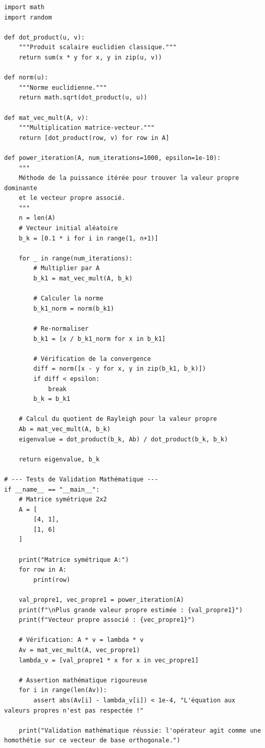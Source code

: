 \documentclass[11pt,a4paper]{article}
\begin{document}
\begin{lstlisting}
import math
import random

def dot_product(u, v):
    """Produit scalaire euclidien classique."""
    return sum(x * y for x, y in zip(u, v))

def norm(u):
    """Norme euclidienne."""
    return math.sqrt(dot_product(u, u))

def mat_vec_mult(A, v):
    """Multiplication matrice-vecteur."""
    return [dot_product(row, v) for row in A]

def power_iteration(A, num_iterations=1000, epsilon=1e-10):
    """
    Méthode de la puissance itérée pour trouver la valeur propre dominante
    et le vecteur propre associé.
    """
    n = len(A)
    # Vecteur initial aléatoire
    b_k = [0.1 * i for i in range(1, n+1)]

    for _ in range(num_iterations):
        # Multiplier par A
        b_k1 = mat_vec_mult(A, b_k)

        # Calculer la norme
        b_k1_norm = norm(b_k1)

        # Re-normaliser
        b_k1 = [x / b_k1_norm for x in b_k1]

        # Vérification de la convergence
        diff = norm([x - y for x, y in zip(b_k1, b_k)])
        if diff < epsilon:
            break
        b_k = b_k1

    # Calcul du quotient de Rayleigh pour la valeur propre
    Ab = mat_vec_mult(A, b_k)
    eigenvalue = dot_product(b_k, Ab) / dot_product(b_k, b_k)

    return eigenvalue, b_k

# --- Tests de Validation Mathématique ---
if __name__ == "__main__":
    # Matrice symétrique 2x2
    A = [
        [4, 1],
        [1, 6]
    ]

    print("Matrice symétrique A:")
    for row in A:
        print(row)

    val_propre1, vec_propre1 = power_iteration(A)
    print(f"\nPlus grande valeur propre estimée : {val_propre1}")
    print(f"Vecteur propre associé : {vec_propre1}")

    # Vérification: A * v = lambda * v
    Av = mat_vec_mult(A, vec_propre1)
    lambda_v = [val_propre1 * x for x in vec_propre1]

    # Assertion mathématique rigoureuse
    for i in range(len(Av)):
        assert abs(Av[i] - lambda_v[i]) < 1e-4, "L'équation aux valeurs propres n'est pas respectée !"

    print("Validation mathématique réussie: l'opérateur agit comme une homothétie sur ce vecteur de base orthogonale.")
\end{lstlisting}
\end{document}
